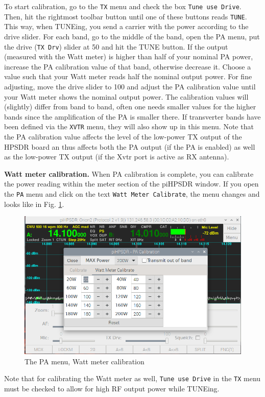 \documentclass[12pt]{book}
\def\rett#1{\texttt{\color{red}#1}}
\def\bltt#1{\texttt{\color{blue}#1}}
\begin{document}
To start calibration, go to the \bltt{TX} menu and check the
box \rett{Tune use Drive}. Then, hit the rightmost toolbar button
until one of these buttons reads \bltt{TUNE}. This way, when
TUNEing, you send a carrier with the power according to the drive
slider. For each band, go to the middle of the band, open the PA
menu, put the drive (\rett{TX Drv}) slider at 50 and hit the TUNE button. If the
output (measured with the Watt meter) is higher than half
 of your nominal PA power, increase the
PA calibration value of that band, otherwise decrease it. Choose
a value such that your Watt meter reads half the nominal output
power. For fine adjusting, move the drive slider to 100 and
adjust the PA calibration value until your Watt meter shows the
nominal output  power. The calibration values will  (slightly)
differ from band to band, often one needs smaller values for the
higher bands since the amplification of the PA is smaller there.
If transverter bands have been defined via the \bltt{XVTR} menu,
they will also show up in this menu. Note that the PA calibration
value affects the level of the low-power TX output of the HPSDR board
an thus affects both the PA output (if the PA is enabled) as well
as the low-power TX output (if the Xvtr port is active as RX antenna).

\textbf{Watt meter calibration.} When PA calibration is complete,
you can calibrate the power reading within the meter section of
the piHPSDR window. If you open the \bltt{PA} menu and click
on the text \rett{Watt Meter Calibrate}, the menu changes
and looks like in Fig. \ref{fig:PAMenuWatt}.

\begin{figure}[ht]
\center
\includegraphics[width=12cm]{PAMenuWatt.png}
\caption{The PA menu, Watt meter calibration}
\label{fig:PAMenuWatt}
\end{figure}
Note that for calibrating the Watt meter as well, 
 \rett{Tune use Drive} in the \bltt{TX} menu must be checked
 to allow for high RF output
power while TUNEing.
\end{document}
